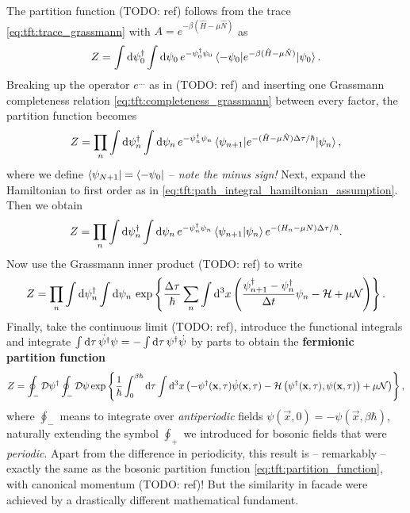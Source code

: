 The partition function (TODO: ref) follows from the trace \eqref{eq:tft:trace_grassmann} with $A = e^{-\beta (\hat{H} - \mu \hat{N})}$ as
\begin{equation}
	Z = \int \mathop{}\!\mathrm{d} \psi_0^\dagger \int \mathop{}\!\mathrm{d} \psi_0 \, e^{-\psi_{0}^\dagger \psi_{0}} \braket{-\psi_0 | e^{-\beta(\hat{H} - \mu \hat{N})} | \psi_0} .
\end{equation}
Breaking up the operator $e^{\ldots}$ as in (TODO: ref) and inserting one Grassmann completeness relation \eqref{eq:tft:completeness_grassmann} between every factor, the partition function becomes
\begin{equation}
	Z = \prod_n \int \mathop{}\!\mathrm{d} \psi_n^\dagger \int \mathop{}\!\mathrm{d} \psi_n \, e^{-\psi_{n}^\dagger \psi_{n}} \braket{\psi_{n+1} | e^{-(\hat{H} - \mu \hat{N}) \Delta \tau / \hbar} | \psi_n} ,
\end{equation}
where we define $\bra{\psi_{N+1}} = \bra{-\psi_0}$ -- \emph{note the minus sign!}
Next, expand the Hamiltonian to first order as in \eqref{eq:tft:path_integral_hamiltonian_assumption}.
Then we obtain
\begin{equation}
	Z = \prod_n \int \mathop{}\!\mathrm{d} \psi_n^\dagger \int \mathop{}\!\mathrm{d} \psi_n \, e^{-\psi_{n}^\dagger \psi_{n}} \braket{\psi_{n+1} | \psi_n} e^{-(H_n - \mu N) \Delta \tau / \hbar} .
\end{equation}
Now use the Grassmann inner product (TODO: ref) to write
\begin{equation}
	Z = \prod_n \int \mathop{}\!\mathrm{d} \psi_n^\dagger \int \mathop{}\!\mathrm{d} \psi_n \, \exp \left\{ \frac{\Delta \tau}{\hbar} \sum_n \int \mathop{}\!\mathrm{d}^3 x \left( \frac{\psi^\dagger_{n+1} - \psi^\dagger_n}{\Delta t} \psi_{n} - \mathcal{H} + \mu \mathcal{N} \right) \right\} .
\end{equation}
Finally, take the continuous limit (TODO: ref), introduce the functional integrals and integrate $\int \mathop{}\!\mathrm{d} \tau \, \dot{\psi^\dagger} \psi = -\int \mathop{}\!\mathrm{d} \tau \, \psi^\dagger \dot{\psi}$ by parts to obtain the \textbf{fermionic partition function}
\begin{equation}
	Z = \oint_- \mathcal{D} \psi^\dagger \oint_- \mathcal{D} \psi \exp \left\{ \frac{1}{\hbar} \int_0^{\beta \hbar} \mathop{}\!\mathrm{d} \tau \int \mathop{}\!\mathrm{d}^3 x \left( -\psi^\dagger(\mathbf{x},\tau) \dot{\psi}(\mathbf{x},\tau) - \mathcal{H} \left( \psi^\dagger(\mathbf{x},\tau), \psi(\mathbf{x},\tau) \right) + \mu \mathcal{N} \right) \right\} ,
\end{equation}
where $\oint_-$ means to integrate over \emph{antiperiodic} fields $\psi(\vec{x}, 0) = -\psi(\vec{x}, \beta \hbar)$, naturally extending the symbol $\oint_+$ we introduced for bosonic fields that were \emph{periodic}.
Apart from the difference in periodicity, this result is -- remarkably -- exactly the same as the bosonic partition function \eqref{eq:tft:partition_function}, with canonical momentum (TODO: ref)!
But the similarity in facade were achieved by a drastically different mathematical fundament.

